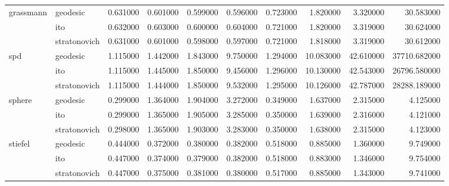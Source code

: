 \begin{tabular}{llrrrrrrrr}
\cline{1-10}
\multirow[t]{3}{*}{grassmann} & geodesic & 0.631000 & 0.601000 & 0.599000 & 0.596000 & 0.723000 & 1.820000 & 3.320000 & 30.583000 \\
 & ito & 0.632000 & 0.603000 & 0.600000 & 0.604000 & 0.721000 & 1.820000 & 3.319000 & 30.624000 \\
 & stratonovich & 0.631000 & 0.601000 & 0.598000 & 0.597000 & 0.721000 & 1.818000 & 3.319000 & 30.612000 \\
\cline{1-10}
\multirow[t]{3}{*}{spd} & geodesic & 1.115000 & 1.442000 & 1.843000 & 9.750000 & 1.294000 & 10.083000 & 42.610000 & 37710.682000 \\
 & ito & 1.115000 & 1.445000 & 1.850000 & 9.456000 & 1.296000 & 10.130000 & 42.543000 & 26796.580000 \\
 & stratonovich & 1.115000 & 1.444000 & 1.850000 & 9.532000 & 1.295000 & 10.126000 & 42.787000 & 28288.189000 \\
\cline{1-10}
\multirow[t]{3}{*}{sphere} & geodesic & 0.299000 & 1.364000 & 1.904000 & 3.272000 & 0.349000 & 1.637000 & 2.315000 & 4.125000 \\
 & ito & 0.299000 & 1.365000 & 1.905000 & 3.285000 & 0.350000 & 1.639000 & 2.316000 & 4.121000 \\
 & stratonovich & 0.298000 & 1.365000 & 1.903000 & 3.283000 & 0.350000 & 1.638000 & 2.315000 & 4.123000 \\
\cline{1-10}
\multirow[t]{3}{*}{stiefel} & geodesic & 0.444000 & 0.372000 & 0.380000 & 0.382000 & 0.518000 & 0.885000 & 1.360000 & 9.749000 \\
 & ito & 0.447000 & 0.374000 & 0.379000 & 0.382000 & 0.518000 & 0.883000 & 1.346000 & 9.754000 \\
 & stratonovich & 0.447000 & 0.375000 & 0.381000 & 0.380000 & 0.517000 & 0.885000 & 1.343000 & 9.741000 \\
\cline{1-10}
\bottomrule
\end{tabular}
